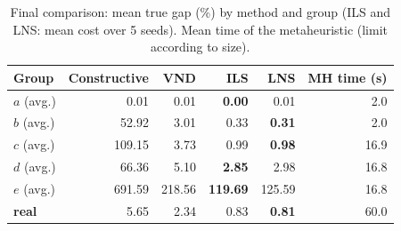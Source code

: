 \documentclass[11pt,a4paper]{article}
\begin{document}
\begin{table}[ht]
\centering
\caption{Final comparison: mean true gap (\%) by method and group (ILS and LNS: mean cost over 5
seeds). Mean time of the metaheuristic (limit according to size).}
\label{tab:final}
\small
\begin{tabular}{l r r r r r}
\toprule
Group & Constructive & VND & ILS & LNS & MH time (s) \\
\midrule
$a$ (avg.)    & 0.01 & 0.01 & \textbf{0.00} & 0.01 & 2.0 \\
$b$ (avg.)    & 52.92 & 3.01 & 0.33 & \textbf{0.31} & 2.0 \\
$c$ (avg.)    & 109.15 & 3.73 & 0.99 & \textbf{0.98} & 16.9 \\
$d$ (avg.)    & 66.36 & 5.10 & \textbf{2.85} & 2.98 & 16.8 \\
$e$ (avg.)    & 691.59 & 218.56 & \textbf{119.69} & 125.59 & 16.8 \\
\textbf{real} & 5.65 & 2.34 & 0.83 & \textbf{0.81} & 60.0 \\
\bottomrule
\end{tabular}
\end{table}

\begin{table}[ht]
\centering
\caption{ILS vs.\ LNS: cost over 5 seeds (best / worst / mean / standard deviation) on one instance
per group plus the real one, and the optimum. Lower is better; best mean cost per row in bold.}
\label{tab:ils_lns}
\small
{}
\end{table}
\end{document}
